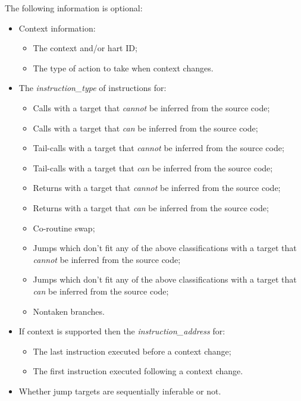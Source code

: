 The following information is optional:

\begin{itemize}
  \item Context information:
    \begin{itemize}
      \item The context and/or hart ID;
      \item The type of action to take when context changes.
    \end{itemize}
  \item The \textit{instruction\_type} of instructions for:
    \begin{itemize}
      \item Calls with a target that \textit{cannot} be inferred from the source code;
      \item Calls with a target that \textit{can} be inferred from the source code;
      \item Tail-calls with a target that \textit{cannot} be inferred from the source code;
      \item Tail-calls with a target that \textit{can} be inferred from the source code;
      \item Returns with a target that \textit{cannot} be inferred from the source code;
      \item Returns with a target that \textit{can} be inferred from the source code;
      \item Co-routine swap;
      \item Jumps which don't fit any of the above classifications with a target that \textit{cannot} be inferred from the source code;
      \item Jumps which don't fit any of the above classifications with a target that \textit{can} be inferred from the source code;
      \item Nontaken branches.
    \end{itemize}
  \item If context is supported then the \textit{instruction\_address} for:
    \begin{itemize}
      \item The last instruction executed before a context change;
      \item The first instruction executed following a context change.
    \end{itemize}
  \item Whether jump targets are sequentially inferable or not.
\end{itemize}


